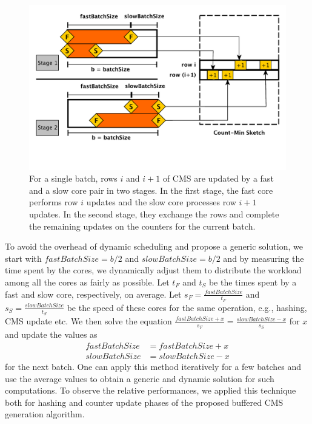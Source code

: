 \documentclass[runningheads]{llncs}
\begin{document}
\begin{figure}[htbp]
\begin{minipage}[c]{0.65\textwidth}
\includegraphics[width=\textwidth]{expfigs/fastslow.pdf}
  \end{minipage}\hfill\hfill\hfill
 \begin{minipage}[c]{0.32\textwidth}
\caption{\small{For a single batch, rows $i$ and $i+1$ of CMS are updated by a fast and a slow core pair in two stages. In the first stage, the fast core performs row $i$ updates and the slow core processes row $i+1$ updates. In the second stage, they exchange the rows and complete the remaining updates on the counters for the current batch.}}
\label{fig:fastslow}
  \end{minipage}
  \vspace*{-4ex}
\end{figure}


To avoid the overhead of dynamic scheduling and propose a generic solution, we start with $fastBatchSize = b/2$ and $slowBatchSize = b/2$ and by measuring the time spent by the cores, we dynamically adjust them to distribute the workload among all the cores as fairly as possible. Let $t_F$ and $t_S$ be the times spent by a fast and slow core, respectively, on average. Let $s_F = \frac{fastBatchSize}{t_F}$ and $s_S = \frac{slowBatchSize}{t_S}$ be the speed of these cores for the same operation, e.g., hashing, CMS update etc. We then solve the equation $\frac{fastBatchSize + x}{s_F} = \frac{slowBatchSize - x}{s_S}$ for $x$ and update the values as 
\begin{align*}
fastBatchSize &= fastBatchSize + x\\
slowBatchSize &= slowBatchSize - x
\end{align*}
for the next batch. One can apply this method iteratively for a few batches and use the average values to obtain a generic and dynamic solution for such computations. To observe the relative performances, we applied this technique both for hashing and counter update phases of the proposed buffered CMS generation algorithm.
\end{document}
